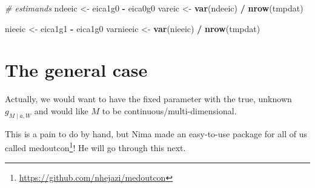 \documentclass[
  12pt, krantz2,
]{book}
\makeatletter
\newenvironment{Shaded}{\begin{snugshade}}{\end{snugshade}}
\newcommand{\CommentTok}[1]{\textcolor[rgb]{0.56,0.35,0.01}{\textit{#1}}}
\newcommand{\KeywordTok}[1]{\textcolor[rgb]{0.13,0.29,0.53}{\textbf{#1}}}
\newcommand{\NormalTok}[1]{#1}
\newcommand{\OperatorTok}[1]{\textcolor[rgb]{0.81,0.36,0.00}{\textbf{#1}}}
\newcommand{\StringTok}[1]{\textcolor[rgb]{0.31,0.60,0.02}{#1}}
\renewcommand{\href}[2]{#2\footnote{\url{#1}}}
\newenvironment{kframe}{%
\medskip{}
\setlength{\fboxsep}{.8em}
 \def\at@end@of@kframe{}%
 \ifinner\ifhmode%
  \def\at@end@of@kframe{\end{minipage}}%
  \begin{minipage}{\columnwidth}%
 \fi\fi%
 \def\FrameCommand##1{\hskip\@totalleftmargin \hskip-\fboxsep
 \colorbox{shadecolor}{##1}\hskip-\fboxsep
     \hskip-\linewidth \hskip-\@totalleftmargin \hskip\columnwidth}%
 \MakeFramed {\advance\hsize-\width
   \@totalleftmargin\z@ \linewidth\hsize
   \@setminipage}}%
 {\par\unskip\endMakeFramed%
 \at@end@of@kframe}
\renewenvironment{Shaded}{\begin{kframe}}{\end{kframe}}
\theoremstyle{definition}
\theoremstyle{definition}
\theoremstyle{definition}
\newcommand{\1}{\mathbbm{1}}
\makeatother
\begin{document}
\begin{Shaded}
\begin{Highlighting}[]
\CommentTok{# estimands}
\NormalTok{ndeeic <-}\StringTok{ }\NormalTok{eica1g0 }\OperatorTok{-}\StringTok{ }\NormalTok{eica0g0}
\NormalTok{vareic <-}\StringTok{ }\KeywordTok{var}\NormalTok{(ndeeic) }\OperatorTok{/}\StringTok{ }\KeywordTok{nrow}\NormalTok{(tmpdat)}

\NormalTok{nieeic <-}\StringTok{ }\NormalTok{eica1g1 }\OperatorTok{-}\StringTok{ }\NormalTok{eica1g0}
\NormalTok{varnieeic <-}\StringTok{ }\KeywordTok{var}\NormalTok{(nieeic) }\OperatorTok{/}\StringTok{ }\KeywordTok{nrow}\NormalTok{(tmpdat)}
\end{Highlighting}
\end{Shaded}

\hypertarget{the-general-case}{%
\section{The general case}\label{the-general-case}}

Actually, we would want to have the fixed parameter with the true, unknown
\(g_{M \mid a, W}\) and would like \(M\) to be continuous/multi-dimensional.

This is a pain to do by hand, but Nima made an easy-to-use package for all of us
called \href{https://github.com/nhejazi/medoutcon}{medoutcon}! He will go through
this next.

  

\backmatter
\printindex
\end{document}
